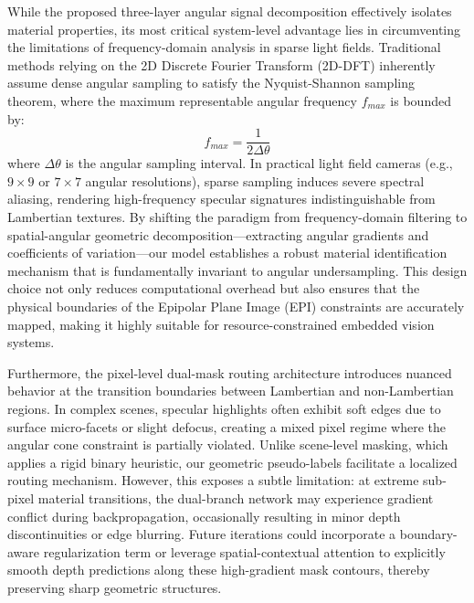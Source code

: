 \documentclass[lettersize,journal]{IEEEtran}
\begin{document}
While the proposed three-layer angular signal decomposition effectively isolates material properties, its most critical system-level advantage lies in circumventing the limitations of frequency-domain analysis in sparse light fields. Traditional methods relying on the 2D Discrete Fourier Transform (2D-DFT) inherently assume dense angular sampling to satisfy the Nyquist-Shannon sampling theorem, where the maximum representable angular frequency $f_{max}$ is bounded by:
\begin{equation}
f_{max} = \frac{1}{2 \Delta \theta}
\end{equation}
where $\Delta \theta$ is the angular sampling interval. In practical light field cameras (e.g., $9 \times 9$ or $7 \times 7$ angular resolutions), sparse sampling induces severe spectral aliasing, rendering high-frequency specular signatures indistinguishable from Lambertian textures. By shifting the paradigm from frequency-domain filtering to spatial-angular geometric decomposition---extracting angular gradients and coefficients of variation---our model establishes a robust material identification mechanism that is fundamentally invariant to angular undersampling. This design choice not only reduces computational overhead but also ensures that the physical boundaries of the Epipolar Plane Image (EPI) constraints are accurately mapped, making it highly suitable for resource-constrained embedded vision systems.

Furthermore, the pixel-level dual-mask routing architecture introduces nuanced behavior at the transition boundaries between Lambertian and non-Lambertian regions. In complex scenes, specular highlights often exhibit soft edges due to surface micro-facets or slight defocus, creating a mixed pixel regime where the angular cone constraint is partially violated. Unlike scene-level masking, which applies a rigid binary heuristic, our geometric pseudo-labels facilitate a localized routing mechanism. However, this exposes a subtle limitation: at extreme sub-pixel material transitions, the dual-branch network may experience gradient conflict during backpropagation, occasionally resulting in minor depth discontinuities or edge blurring. Future iterations could incorporate a boundary-aware regularization term or leverage spatial-contextual attention to explicitly smooth depth predictions along these high-gradient mask contours, thereby preserving sharp geometric structures.
\end{document}
